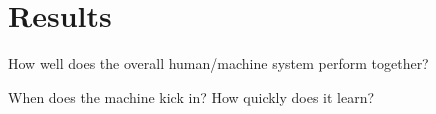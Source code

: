 \documentclass[twocolumn]{aastex6}
\begin{document}

\section{Results}
How well does the overall human/machine system perform together? 

When does the machine kick in? How quickly does it learn? 
\end{document}
